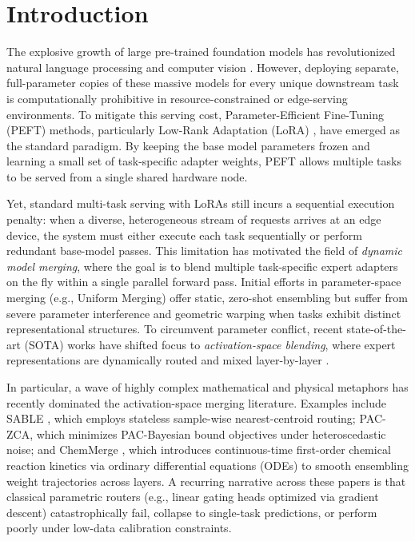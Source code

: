 \section{Introduction}
\label{sec:intro}

The explosive growth of large pre-trained foundation models has revolutionized natural language processing and computer vision \citep{touvron23llama, dosovitskiy20vit}. However, deploying separate, full-parameter copies of these massive models for every unique downstream task is computationally prohibitive in resource-constrained or edge-serving environments. To mitigate this serving cost, Parameter-Efficient Fine-Tuning (PEFT) methods, particularly Low-Rank Adaptation (LoRA) \citep{hu2021lora}, have emerged as the standard paradigm. By keeping the base model parameters frozen and learning a small set of task-specific adapter weights, PEFT allows multiple tasks to be served from a single shared hardware node.

Yet, standard multi-task serving with LoRAs still incurs a sequential execution penalty: when a diverse, heterogeneous stream of requests arrives at an edge device, the system must either execute each task sequentially or perform redundant base-model passes. This limitation has motivated the field of \emph{dynamic model merging}, where the goal is to blend multiple task-specific expert adapters on the fly within a single parallel forward pass. Initial efforts in parameter-space merging (e.g., Uniform Merging) offer static, zero-shot ensembling but suffer from severe parameter interference and geometric warping when tasks exhibit distinct representational structures. To circumvent parameter conflict, recent state-of-the-art (SOTA) works have shifted focus to \emph{activation-space blending}, where expert representations are dynamically routed and mixed layer-by-layer \citep{liang23sable, zhang24spszca}.

In particular, a wave of highly complex mathematical and physical metaphors has recently dominated the activation-space merging literature. Examples include SABLE \citep{liang23sable}, which employs stateless sample-wise nearest-centroid routing; PAC-ZCA, which minimizes PAC-Bayesian bound objectives under heteroscedastic noise; and ChemMerge \citep{chemmerge25}, which introduces continuous-time first-order chemical reaction kinetics via ordinary differential equations (ODEs) to smooth ensembling weight trajectories across layers. A recurring narrative across these papers is that classical parametric routers (e.g., linear gating heads optimized via gradient descent) catastrophically fail, collapse to single-task predictions, or perform poorly under low-data calibration constraints.

